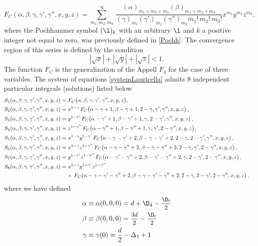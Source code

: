 \documentclass[a4paper,11pt,openright,twoside]{book}
\let\a=\alpha   \let\b=\beta   \let\g=\gamma   \let\d=\delta
\newcommand{\sdfrac}[2]{\mbox{\small$\displaystyle\frac{#1}{#2}$}}
\numberwithin{equation}{section}
\begin{document}
{{	\begin{equation}
		F_C(\a,\b,\g,\g',\g'',x,y,z)=\sum\limits_{m_1,m_2,m_3}^\infty\,\frac{(\a)_{m_1+m_2+m_3}(\b)_{m_1+m_2+m_3}}{(\g)_{m_1}(\g')_{m_2}(\g'')_{m_3}m_1!\,m_2!\,m_3!}x^{m_1}y^{m_2}z^{m_3}.
	\end{equation}
	where the Pochhammer symbol $(\l)_{k}$ with an arbitrary $\l$ and $k$ a positive integer not equal to zero, was previously defined in \eqref{Pochh}. The convergence region of this series is defined by the condition
	\begin{equation}
		\left|\sqrt{x}\right|+\left|\sqrt{y}\right|+\left|\sqrt{z}\right|<1.
	\end{equation}
	The function $F_C$ is the generalization of the Appell $F_4$ for the case of three variables.
	The system of equations \eqref{systemLauricella} admits 8 independent particular integrals (solutions) listed below
	\begin{align}
		&S_1(\a,\b,\g,\g',\g'',x,y,z)=F_C\big(\a,\b,\g,\g',\g'',x,y,z\big)\notag,\\
		&S_2(\a,\b,\g,\g',\g'',x,y,z)=x^{1-\g}\,F_C\big(\a-\g+1,\b-\g+1,2-\g,\g',\g'',x,y,z\big)\notag\,,\\
		&S_3(\a,\b,\g,\g',\g'',x,y,z)= y^{1-\g'}\,F_C\big(\a-\g'+1,\b-\g'+1,\g,2-\g',\g'',x,y,z\big)\notag\,,\\
		&S_4(\a,\b,\g,\g',\g'',x,y,z)=z^{1-\g''}\,F_C\big(\a-\g''+1,\b-\g''+1,\g,\g',2-\g'',x,y,z\big)\notag,\,\\
		&S_5(\a,\b,\g,\g',\g'',x,y,z)=x^{1-\g}y^{1-\g'}\,F_C\big(\a-\g-\g'+2,\b-\g-\g'+2,2-\g,2-\g',\g'',x,y,z\big)\,,\notag\\
		&S_6(\a,\b,\g,\g',\g'',x,y,z)=x^{1-\g}z^{1-\g''}\,F_C\big(\a-\g-\g''+2,\b-\g-\g''+2,2-\g,\g',2-\g'',x,y,z\big)\notag\,,\\
		&S_7(\a,\b,\g,\g',\g'',x,y,z)=y^{1-\g'}z^{1-\g''}\,F_C\big(\a-\g'-\g''+2,\b-\g'-\g''+2,\g,2-\g',2-\g'',x,y,z\big)\notag\,,\\
		&S_8(\a,\b,\g,\g',\g'',x,y,z)=x^{1-\g}y^{1-\g'}z^{1-\g''}\notag\\
		&\hspace{4cm}\times\,F_C\big(\a-\g-\g'-\g''+2,\b-\g-\g'-\g''+2,2-\g,2-\g',2-\g'',x,y,z\big)\,.\label{oneeq}
	\end{align} 
	where we have defined 
	\begin{align}
		\a&\equiv\a(0,0,0)=d+\D_4-\sdfrac{\D_t}{2}\notag\\	
		\b&\equiv\b(0,0,0)=\sdfrac{3d}{2}-\sdfrac{\D_t}{2}\notag\\
		\g&\equiv\gamma(0)=\frac{d}{2}-\Delta_1+1\notag\\

\end{align}}}
\end{document}
